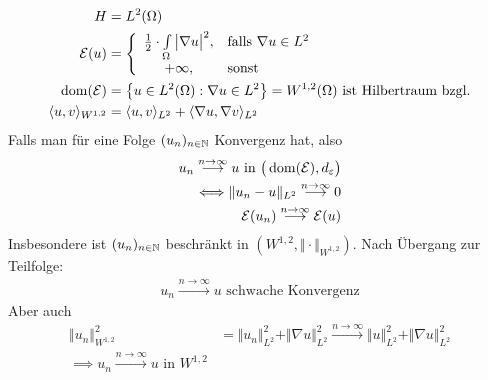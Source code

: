 \begin{beispiel}
	\begin{align*}
		H&=L^2(\Omega)\\
		\mathcal{E}(u)&=\left\lbrace\begin{array}{cl}
			\frac{1}{2}\cdot\int\limits_\Omega\big|\nabla u\big|^2, &\text{falls } \nabla u\in L^2\\
			+\infty, &\text{sonst }		
		\end{array}\right.\\
		\operatorname{dom}(\mathcal{E})&=\left\lbrace u\in L^2(\Omega):\nabla u\in L^2\right\rbrace=W^{1,2}(\Omega)\text{ ist Hilbertraum bzgl.}\\
		\langle u,v\rangle_{W^{1,2}}
		&=\langle u,v\rangle_{L^2}+\langle\nabla u,\nabla v\rangle_{L^2}
	\end{align*}
	Falls man für eine Folge $(u_n)_{n\in\mathbb{N}}$ Konvergenz hat, also
	\begin{align*}
		u_n\overset{n\to\infty}{\longrightarrow} u\text{ in }\big(\operatorname{dom}(\mathcal{E}),d_\varepsilon\big)\\
		\Longleftrightarrow\Vert u_n-u\Vert_{L^2}\overset{n\to\infty}{\longrightarrow}0\\
		\mathcal{E}(u_n)\overset{n\to\infty}{\longrightarrow}\mathcal{E}(u)
	\end{align*}
	Insbesondere ist $(u_n)_{n\in\mathbb{N}}$ beschränkt in $\left(W^{1,2},\Vert\cdot\Vert_{W^{1,2}}\right)$.
	Nach Übergang zur Teilfolge:
	\begin{align*}
		u_n\overset{n\to\infty}{\longrightarrow}u\text{ schwache Konvergenz}
	\end{align*}
	Aber auch
	\begin{align*}
		\Vert u_n\Vert^2_{W^{1,2}}
		&=\Vert u_n\Vert_{L^2}^2+\Vert\nabla u\Vert_{L^2}^2
		\overset{n\to\infty}{\longrightarrow}
		\Vert u\Vert_{L^2}^2+\Vert\nabla u\Vert_{L^2}^2\\
		\implies u_n\overset{n\to\infty}{\longrightarrow} u\text{ in }W^{1,2}
	\end{align*}
\end{beispiel}

